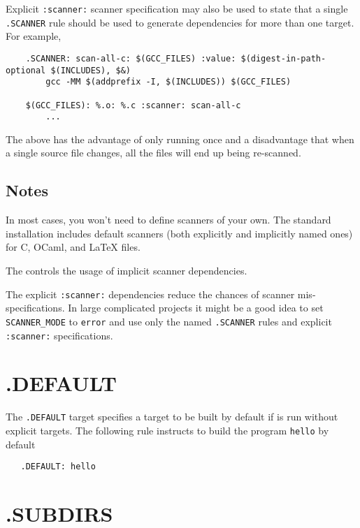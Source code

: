 Explicit \verb+:scanner:+ scanner specification may also be used to state that a single
\verb+.SCANNER+ rule should be used to generate dependencies for more than one target. For example,

\begin{verbatim}
    .SCANNER: scan-all-c: $(GCC_FILES) :value: $(digest-in-path-optional $(INCLUDES), $&)
        gcc -MM $(addprefix -I, $(INCLUDES)) $(GCC_FILES)

    $(GCC_FILES): %.o: %.c :scanner: scan-all-c
        ...
\end{verbatim}

The above has the advantage of only running  once and a disadvantage that when a single
source file changes, all the files will end up being re-scanned.

\subsection{Notes}

In most cases, you won't need to define scanners of your own.  The standard installation includes
default scanners (both explicitly and implicitly named ones) for C, OCaml, and \LaTeX{} files.

The  controls the usage of implicit scanner dependencies.

The explicit \verb+:scanner:+ dependencies reduce the chances of scanner mis-specifications. In
large complicated projects it might be a good idea to set \verb+SCANNER_MODE+ to \verb+error+ and
use only the named \verb+.SCANNER+ rules and explicit \verb+:scanner:+ specifications.

\section{.DEFAULT}

The \verb+.DEFAULT+ target specifies a target to be built by default
if  is run without explicit targets.  The following rule
instructs  to build the program \verb+hello+ by default

\begin{verbatim}
   .DEFAULT: hello
\end{verbatim}

\section{.SUBDIRS}

